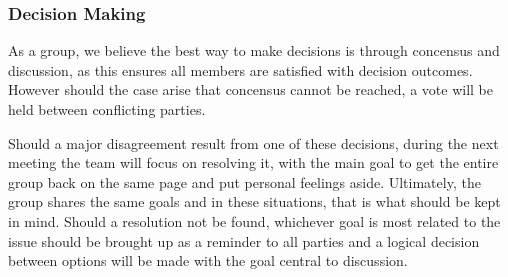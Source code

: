 \documentclass{article}
\begin{document}
\subsubsection*{Decision Making} 

\iffalse
\wss{How will you make decisions in your group? Consensus?  Vote? How will you
handle disagreements? }
\fi

As a group, we believe the best way to make decisions is through concensus and discussion, 
as this ensures all members are satisfied with decision outcomes. However should the case 
arise that concensus cannot be reached, a vote will be held between conflicting parties.

Should a major disagreement result from one of these decisions, during the next meeting 
the team will focus on resolving it, with the main goal to get the entire group back on 
the same page and put personal feelings aside. Ultimately, the group shares the same goals 
and in these situations, that is what should be kept in mind. Should a resolution not be found, 
whichever goal is most related to the issue should be brought up as a reminder to all 
parties and a logical decision between options will be made with the goal central to discussion.
\end{document}
